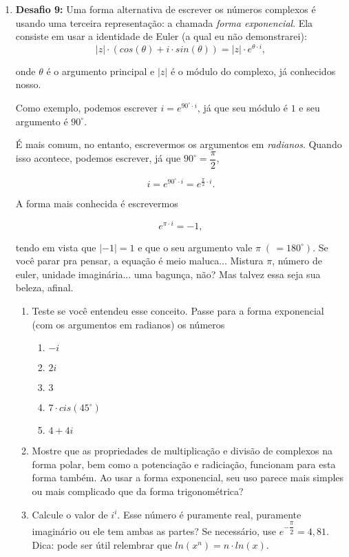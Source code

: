 \documentclass[a4paper, 11pt]{article}
\begin{document}
\begin{enumerate}
\item \textbf{Desafio 9:} Uma forma alternativa de escrever os números complexos é usando uma terceira representação: a chamada \textit{forma exponencial}. Ela consiste em usar a identidade de Euler (a qual eu não demonstrarei):
	$$ |z|\cdot ( cos(\theta) + i\cdot sin(\theta) ) = |z|\cdot e^{\theta\cdot i} ,$$
	
	onde $\theta$ é o argumento principal e $|z|$ é o módulo do complexo, já conhecidos nosso.
	
Como exemplo, podemos escrever $i = e^{ 90^{\circ} \cdot i} $, já que seu módulo é $1$ e seu argumento é $90^{\circ}$.

É mais comum, no entanto, escrevermos os argumentos em \textit{radianos}. Quando isso acontece, podemos escrever, já que $90^{\circ} = \dfrac{\pi}{2}$, 

$$i = e^{ 90^{\circ} \cdot i} = e^{\frac{\pi}{2} \cdot i} .$$

A forma mais conhecida é escrevermos 

$$e^{\pi \cdot i} = -1,$$

tendo em vista que $|-1| = 1$ e que o seu argumento vale $\pi \; ( \, = 180^{\circ}).$ Se você parar pra pensar, a equação é meio maluca... Mistura $\pi$, número de euler, unidade imaginária... uma bagunça, não? Mas talvez essa seja sua beleza, afinal.

	\begin{enumerate}
	
	\item Teste se você entendeu esse conceito. Passe para a forma exponencial (com os argumentos em radianos) os números
		\begin{enumerate}
		\item $-i$
		\item $2i$
		\item $3$
		\item $7\cdot cis(45^{\circ})$
		\item $4 + 4i$
		\end{enumerate}
		
	\item Mostre que as propriedades de multiplicação e divisão de complexos na forma polar, bem como a potenciação e radiciação, funcionam para esta forma também. Ao usar a forma exponencial, seu uso parece mais simples ou mais complicado que da forma trigonométrica? 
	
	\item Calcule o valor de $i^i$. Esse número é puramente real, puramente imaginário ou ele tem ambas as partes?
	 Se necessário, use $e^{-\dfrac{\pi}{2}} = 4,81.$
	 Dica: pode ser útil relembrar que $ln(x^n) = n\cdot ln(x).$			
	

\end{enumerate}
\end{enumerate}
\end{document}
